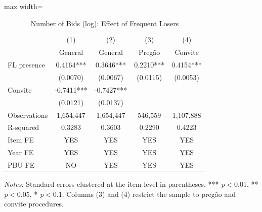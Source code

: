 \begin{table}[htbp]
\centering
\caption{Number of Bids (log): Effect of Frequent Losers}
\label{tab:nbids}
\begin{adjustbox}{max width=\textwidth}
\begin{threeparttable}
\small
\begin{tabular}{lcccc}
\toprule
 & (1) & (2) & (3) & (4) \\
 & General & General & Preg\~{a}o & Convite \\
\midrule
FL presence & 0.4164*** & 0.3646*** & 0.2210*** & 0.4154*** \\
 & (0.0070) & (0.0067) & (0.0115) & (0.0053) \\
Convite & -0.7411*** & -0.7427*** &  &  \\
 & (0.0121) & (0.0137) &  &  \\
\midrule
Observations & 1,654,447 & 1,654,447 & 546,559 & 1,107,888 \\
R-squared & 0.3283 & 0.3603 & 0.2290 & 0.4223 \\
Item FE & YES & YES & YES & YES \\
Year FE & YES & YES & YES & YES \\
PBU FE & NO & YES & YES & YES \\
\bottomrule
\end{tabular}
\begin{tablenotes}
\small
\item \textit{Notes:} Standard errors clustered at the item level in parentheses. *** \textit{p}$<$0.01, ** \textit{p}$<$0.05, * \textit{p}$<$0.1. Columns (3) and (4) restrict the sample to preg\~{a}o and convite procedures.
\end{tablenotes}
\end{threeparttable}
\end{adjustbox}
\end{table}
